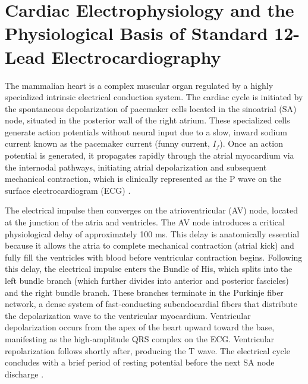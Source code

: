 \documentclass[12pt,a4paper]{report}
\begin{document}
\section{Cardiac Electrophysiology and the Physiological Basis of Standard 12-Lead Electrocardiography}
The mammalian heart is a complex muscular organ regulated by a highly specialized intrinsic electrical conduction system. The cardiac cycle is initiated by the spontaneous depolarization of pacemaker cells located in the sinoatrial (SA) node, situated in the posterior wall of the right atrium. These specialized cells generate action potentials without neural input due to a slow, inward sodium current known as the pacemaker current (funny current, $I_f$). Once an action potential is generated, it propagates rapidly through the atrial myocardium via the internodal pathways, initiating atrial depolarization and subsequent mechanical contraction, which is clinically represented as the P wave on the surface electrocardiogram (ECG) \cite{schlapfer2017ecg}.

The electrical impulse then converges on the atrioventricular (AV) node, located at the junction of the atria and ventricles. The AV node introduces a critical physiological delay of approximately 100 ms. This delay is anatomically essential because it allows the atria to complete mechanical contraction (atrial kick) and fully fill the ventricles with blood before ventricular contraction begins. Following this delay, the electrical impulse enters the Bundle of His, which splits into the left bundle branch (which further divides into anterior and posterior fascicles) and the right bundle branch. These branches terminate in the Purkinje fiber network, a dense system of fast-conducting subendocardial fibers that distribute the depolarization wave to the ventricular myocardium. Ventricular depolarization occurs from the apex of the heart upward toward the base, manifesting as the high-amplitude QRS complex on the ECG. Ventricular repolarization follows shortly after, producing the T wave. The electrical cycle concludes with a brief period of resting potential before the next SA node discharge \cite{schlapfer2017ecg, goldberger2000physiobank}.
\end{document}
